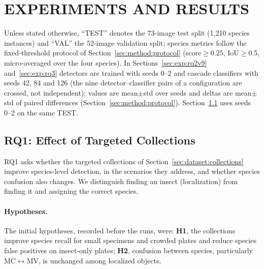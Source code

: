 \section{\uppercase{Experiments and Results}}
\label{sec:experiments}


Unless stated otherwise, ``TEST'' denotes the 73-image test split (1{,}210 species instances) and ``VAL'' the 52-image validation split; species metrics follow the fixed-threshold protocol of Section~\ref{sec:method:protocol} (score$\ge$0.25, IoU$\ge$0.5, micro-averaged over the four species). In Sections~\ref{sec:exp:rq2v9} and~\ref{sec:exp:rq3} detectors are trained with seeds 0--2 and cascade classifiers with seeds 42, 84 and 126 (the nine detector--classifier pairs of a configuration are crossed, not independent); values are mean$\pm$std over seeds and deltas are mean$\pm$std of paired differences (Section~\ref{sec:method:protocol}). Section~\ref{sec:exp:rq1} uses seeds 0--2 on the same TEST.

\subsection{RQ1: Effect of Targeted Collections}
\label{sec:exp:rq1}

RQ1 asks whether the targeted collections of Section~\ref{sec:dataset:collections} improve species-level detection, in the scenarios they address, and whether species confusion also changes. We distinguish finding an insect (localization) from finding it and assigning the correct species.

\paragraph{Hypotheses.}
The initial hypotheses, recorded before the runs, were: \textbf{H1}, the collections improve species recall for small specimens and crowded plates and reduce species false positives on insect-only plates; \textbf{H2}, confusion between species, particularly MC$\leftrightarrow$MV, is unchanged among localized objects.

